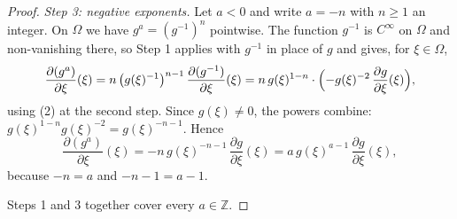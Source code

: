 \begin{proof}
\emph{Step 3: negative exponents.}  Let $a<0$ and write $a=-n$ with $n\ge1$ an
integer.  On $\Omega$ we have $g^{a}=(g^{-1})^{n}$ pointwise.  The function
$g^{-1}$ is $C^\infty$ on $\Omega$ and non-vanishing there, so Step 1 applies
with $g^{-1}$ in place of $g$ and gives, for $\xi\in\Omega$,
\[
  \frac{\partial(g^{a})}{\partial\xi}(\xi)
  =n\,\bigl(g(\xi)^{-1}\bigr)^{n-1}\,\frac{\partial(g^{-1})}{\partial\xi}(\xi)
  =n\,g(\xi)^{1-n}\cdot\Bigl(-g(\xi)^{-2}\,\frac{\partial g}{\partial\xi}(\xi)\Bigr),
\]
using (2) at the second step.  Since $g(\xi)\neq0$, the powers combine:
$g(\xi)^{1-n}g(\xi)^{-2}=g(\xi)^{-n-1}$.  Hence
\[
  \frac{\partial(g^{a})}{\partial\xi}(\xi)
  =-n\,g(\xi)^{-n-1}\,\frac{\partial g}{\partial\xi}(\xi)
  =a\,g(\xi)^{a-1}\,\frac{\partial g}{\partial\xi}(\xi),
\]
because $-n=a$ and $-n-1=a-1$.

Steps 1 and 3 together cover every $a\in\mathbb{Z}$.
\end{proof}
